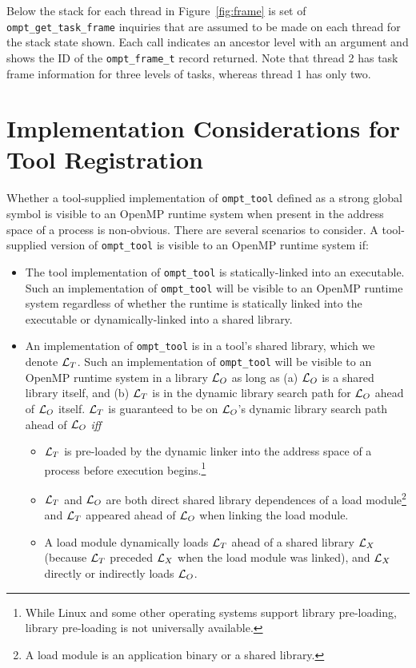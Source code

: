 \documentclass{article}
\begin{document}
{Below the stack for each thread in Figure~\ref{fig:frame}  is set of \verb|ompt_get_task_frame| inquiries that are assumed to be made on each thread for the stack state shown. Each call indicates an ancestor level with an argument and shows the ID of the \verb|ompt_frame_t| record returned. Note that thread 2 has task frame information for three levels of tasks, whereas thread 1 has only two.

\clearpage
\section{Implementation Considerations for Tool  Registration}
\label{app:registration} 

Whether a tool-supplied implementation of  \verb|ompt_tool| defined as a strong global symbol is visible to an OpenMP runtime system when present in the address space of a process is non-obvious. There are several scenarios to consider.
A tool-supplied version of \verb|ompt_tool|  is visible to an OpenMP runtime system if:
\begin{itemize}
\item The tool implementation of  \verb|ompt_tool| is statically-linked into an executable. Such an implementation of  \verb|ompt_tool| will  be visible to an OpenMP runtime system regardless of whether the runtime is statically linked into the executable or dynamically-linked into a shared library. 
\item An implementation of  \verb|ompt_tool|  is in a tool's shared library, which we denote ${\cal L}_T$. Such an implementation of  \verb|ompt_tool| will  be visible to an OpenMP runtime system in a library ${\cal L}_O$ as long as (a) ${\cal L}_O$ is a shared library itself, and (b) ${\cal L}_T$ is in the dynamic library search path for ${\cal L}_O$ ahead of ${\cal L}_O$  itself. ${\cal L}_T$ is guaranteed to be on ${\cal L}_O$'s dynamic library search path ahead of ${\cal L}_O$ {\em iff}
\begin{itemize}
\item ${\cal L}_T$ is pre-loaded by the dynamic linker into the address space of a process before execution begins.\footnote{While Linux and some other operating systems support library pre-loading, library pre-loading is not universally available.}
\item ${\cal L}_T$ and ${\cal L}_O$ are both direct shared library dependences of a load module\footnote{A load module is an application binary or a  shared library.}  and ${\cal L}_T$ appeared ahead of ${\cal L}_O$ when linking the load module.
\item A load module dynamically loads ${\cal L}_T$  ahead of a shared library ${\cal L}_X$ (because ${\cal L}_T$  preceded ${\cal L}_X$ when the load module was linked), and  ${\cal L}_X$ directly or indirectly loads ${\cal L}_O$.
\end{itemize}
\end{itemize}

}
\end{document}

